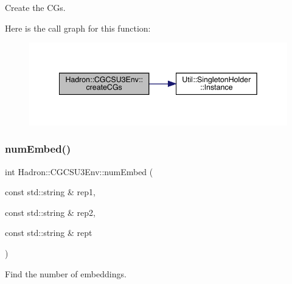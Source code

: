 Create the C\+Gs. 

Here is the call graph for this function\+:\nopagebreak
\begin{figure}[H]
\begin{center}
\leavevmode
\includegraphics[width=342pt]{d4/d47/namespaceHadron_1_1CGCSU3Env_aa351bf5350216c70336911a96182d035_cgraph}
\end{center}
\end{figure}
\mbox{\label{namespaceHadron_1_1CGCSU3Env_acc35e8f63cd5a1ffe14a963df3f2c1fd}} 
\subsubsection{\texorpdfstring{numEmbed()}{numEmbed()}}
{\footnotesize\ttfamily int Hadron\+::\+C\+G\+C\+S\+U3\+Env\+::num\+Embed (\begin{DoxyParamCaption}\item[{const std\+::string \&}]{rep1,  }\item[{const std\+::string \&}]{rep2,  }\item[{const std\+::string \&}]{rept }\end{DoxyParamCaption})}



Find the number of embeddings. 

